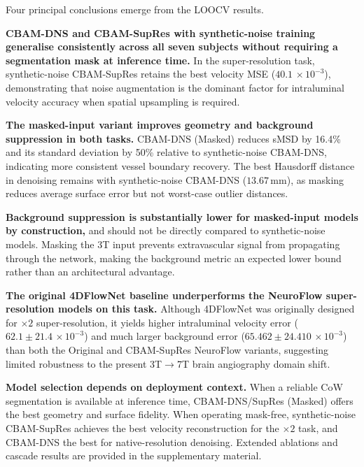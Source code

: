 \documentclass[11pt]{article}
\begin{document}
Four principal conclusions emerge from the LOOCV results.

\textbf{CBAM-DNS and CBAM-SupRes with synthetic-noise training generalise consistently across
all seven subjects without requiring a segmentation mask at inference time.} In the
super-resolution task, synthetic-noise CBAM-SupRes retains the best velocity MSE
($40.1\,{\times}10^{-3}$), demonstrating that noise augmentation is the dominant factor for
intraluminal velocity accuracy when spatial upsampling is required.

\textbf{The masked-input variant improves geometry and background suppression in both tasks.}
CBAM-DNS (Masked) reduces sMSD by 16.4\% and its standard deviation by 50\% relative to
synthetic-noise CBAM-DNS, indicating more consistent vessel boundary recovery. The best
Hausdorff distance in denoising remains with synthetic-noise CBAM-DNS ($13.67$\,mm), as
masking reduces average surface error but not worst-case outlier distances.

\textbf{Background suppression is substantially lower for masked-input models by construction,}
and should not be directly compared to synthetic-noise models. Masking the 3T input prevents
extravascular signal from propagating through the network, making the background metric an
expected lower bound rather than an architectural advantage.

\textbf{The original 4DFlowNet baseline underperforms the NeuroFlow super-resolution models
on this task.} Although 4DFlowNet was originally designed for $\times 2$ super-resolution,
it yields higher intraluminal velocity error ($62.1 \pm 21.4\,{\times}10^{-3}$) and much
larger background error ($65.462 \pm 24.410\,{\times}10^{-3}$) than both the Original and
CBAM-SupRes NeuroFlow variants, suggesting limited robustness to the present 3T$\rightarrow$7T
brain angiography domain shift.

\textbf{Model selection depends on deployment context.} When a reliable CoW segmentation is
available at inference time, CBAM-DNS/SupRes (Masked) offers the best geometry and surface
fidelity. When operating mask-free, synthetic-noise CBAM-SupRes achieves the best velocity
reconstruction for the $\times 2$ task, and CBAM-DNS the best for native-resolution
denoising. Extended ablations and cascade results are provided in the supplementary material.



\end{document}
